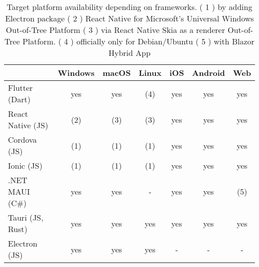 \begin{table}[H]
    \centering
    \begin{tabular}{lcccccc}
      \toprule
                        & Windows &  macOS  & Linux &  iOS  & Android &  Web  \\
      \midrule
      Flutter (Dart)    &   yes   &   yes   &  (4)  &  yes  &   yes   &  yes  \\
      React Native (JS) &   (2)   &   (3)   &  (3)  &  yes  &   yes   &  yes  \\
      Cordova (JS)      &   (1)   &   (1)   &  (1)  &  yes  &   yes   &  yes  \\
      Ionic (JS)        &   (1)   &   (1)   &  (1)  &  yes  &   yes   &  yes  \\
      .NET MAUI (C\#)   &   yes   &   yes   &   -   &  yes  &   yes   &  (5)   \\
      Tauri (JS, Rust)  &   yes   &   yes   &  yes  &  yes  &   yes   &  yes  \\
      Electron (JS)     &   yes   &   yes   &  yes  &  -    &    -    &  -    \\
      \bottomrule
    \end{tabular}
    \caption[Platform availability]{\label{tab:example}Target platform availability depending on frameworks.
    \newline ( 1 ) by adding Electron package
    \newline ( 2 ) React Native for Microsoft's Universal Windows Out-of-Tree Platform
    \newline ( 3 ) via React Native Skia as a renderer Out-of-Tree Platform.
    \newline ( 4 ) officially only for Debian/Ubuntu
    \newline ( 5 ) with Blazor Hybrid App
    }
  
\end{table}